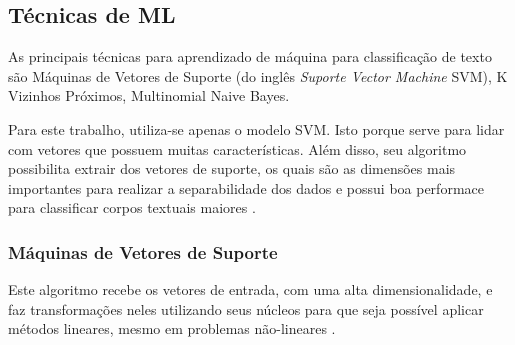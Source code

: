 

\subsection{Técnicas de ML}

As principais técnicas para aprendizado de máquina para classificação de texto são Máquinas de Vetores de Suporte (do inglês \textit{Suporte Vector Machine} SVM), K Vizinhos Próximos, Multinomial Naive Bayes.

Para este trabalho, utiliza-se apenas o modelo SVM. Isto porque serve para lidar com vetores que possuem muitas características. Além disso, seu algoritmo possibilita extrair dos vetores de suporte, os quais são as dimensões mais importantes para realizar a separabilidade dos dados \cite{hearst_support_1998} e possui boa performace para classificar corpos textuais maiores \cite{wang_baselines_2012}.

\subsubsection{Máquinas de Vetores de Suporte}

Este algoritmo recebe os vetores de entrada, com uma alta dimensionalidade, e faz transformações neles utilizando seus núcleos para que seja possível aplicar métodos lineares, mesmo em problemas não-lineares \cite{hearst_support_1998}.

